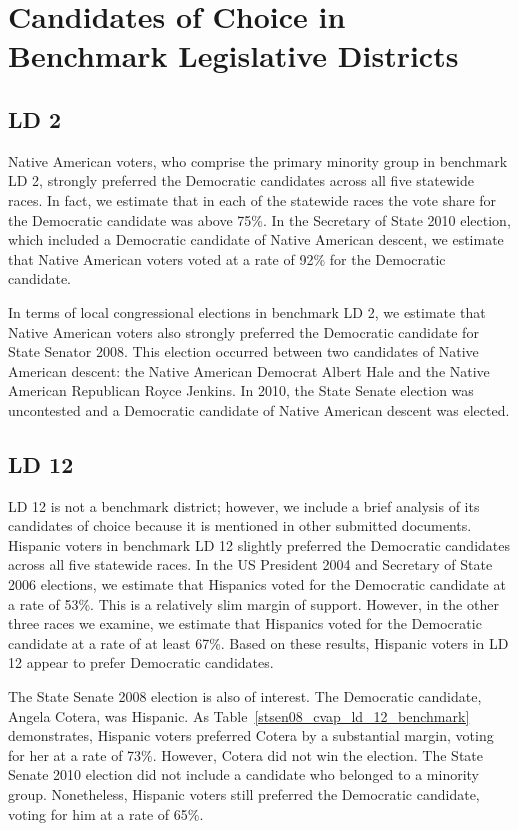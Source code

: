 \documentclass[12pt]{article}
\begin{document}
\section{Candidates of Choice in Benchmark Legislative Districts}

\subsection{LD 2}
Native American voters, who comprise the primary minority group in benchmark LD 2, strongly preferred the Democratic candidates across all five statewide races. In fact, we estimate that in each of the statewide races the vote share for the Democratic candidate was above 75\%. In the Secretary of State 2010 election, which included a Democratic candidate of Native American descent, we estimate that Native American voters voted at a rate of 92\% for the Democratic candidate. 

In terms of local congressional elections in benchmark LD 2, we estimate that Native American voters also strongly preferred the Democratic candidate for State Senator 2008. This election occurred between two candidates of Native American descent: the Native American Democrat Albert Hale and the Native American Republican Royce Jenkins. In 2010, the State Senate election was uncontested and a Democratic candidate of Native American descent was elected. 

\subsection{LD 12}

LD 12 is not a benchmark district; however, we include a brief analysis of its candidates of choice because it is mentioned in other submitted documents. 
Hispanic voters in benchmark LD 12 slightly preferred the Democratic candidates across all five statewide races. In the US President 2004 and Secretary of State 2006 elections, we estimate that Hispanics voted for the Democratic candidate at a rate of 53\%. This is a relatively slim margin of support. However, in the other three races we examine, we estimate that Hispanics voted for the Democratic candidate at a rate of at least 67\%. Based on these results, Hispanic voters in LD 12 appear to prefer Democratic candidates. 

The State Senate 2008 election is also of interest. The Democratic candidate, Angela Cotera, was Hispanic. As Table~\ref{stsen08_cvap_ld_12_benchmark} demonstrates, Hispanic voters preferred Cotera by a substantial margin, voting for her at a rate of 73\%. However, Cotera did not win the election. The State Senate 2010 election did not include a candidate who belonged to a minority group. Nonetheless, Hispanic voters still preferred the Democratic candidate, voting for him at a rate of 65\%.     
\end{document}
